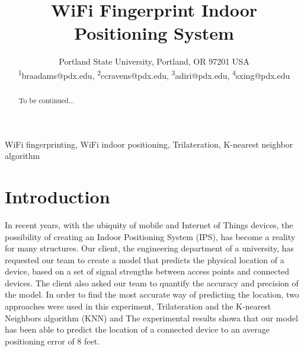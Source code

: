 \documentclass[12pt, conference]{IEEEtran}
\begin{document}
\title{WiFi Fingerprint Indoor Positioning System}

\author{
  {Portland State University, Portland, OR 97201 USA} \\
  \textsuperscript{1}braadams@pdx.edu, \textsuperscript{2}ccravens@pdx.edu, \textsuperscript{3}adiri@pdx.edu, \textsuperscript{4}sxing@pdx.edu
}

\maketitle



\begin{abstract}
  To be continued...
\end{abstract}

\begin{IEEEkeywords}
  WiFi fingerprinting, WiFi indoor positioning, Trilateration, K-nearest neighbor algorithm
\end{IEEEkeywords}


\section{Introduction}
In recent years, with the ubiquity of mobile and Internet of Things devices, the possibility of creating an Indoor Positioning System (IPS), has become a reality for many structures. Our client, the engineering department of a university, has requested our team to create a model that predicts the physical location of a device, based on a set of signal strengths between access points and connected devices. The client also asked our team to quantify the accuracy and precision of the model. In order to find the most accurate way of predicting the location, two approaches were used in this experiment, Trilateration and the K-nearest Neighbors algorithm (KNN) and The experimental results showa that our model has been able to predict the location of a connected device to an average positioning error of 8 feet.
\end{document}
